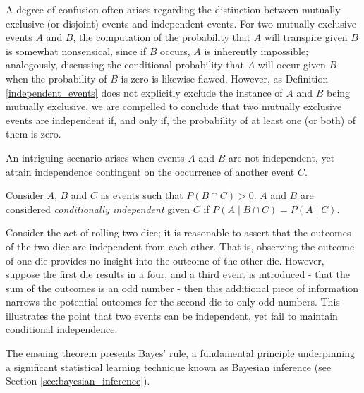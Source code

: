 \begin{example}
A degree of confusion often arises regarding the distinction between mutually exclusive (or disjoint) events and independent events. For two mutually exclusive events $A$ and $B$, the computation of the probability that $A$ will transpire given $B$ is somewhat nonsensical, since if $B$ occurs, $A$ is inherently impossible; analogously, discussing the conditional probability that $A$ will occur given $B$ when the probability of $B$ is zero is likewise flawed. However, as Definition \ref{independent_events} does not explicitly exclude the instance of $A$ and $B$ being mutually exclusive, we are compelled to conclude that two mutually exclusive events are independent if, and only if, the probability of at least one (or both) of them is zero.
\end{example}

An intriguing scenario arises when events $A$ and $B$ are not independent, yet attain independence contingent on the occurrence of another event $C$.

\begin{definition}
Consider $A$, $B$ and $C$ as events such that $P\left( B \cap C \right)>0$. $A$ and $B$ are considered \emph{conditionally independent} given $C$ if $P\left(A \mid B \cap C \right) = P\left( A \mid C \right)$.
\end{definition}

\begin{example}
Consider the act of rolling two dice; it is reasonable to assert that the outcomes of the two dice are independent from each other. That is, observing the outcome of one die provides no insight into the outcome of the other die. However, suppose the first die results in a four, and a third event is introduced - that the sum of the outcomes is an odd number - then this additional piece of information narrows the potential outcomes for the second die to only odd numbers. This illustrates the point that two events can be independent, yet fail to maintain conditional independence.
\end{example}

The ensuing theorem presents Bayes' rule, a fundamental principle underpinning a significant statistical learning technique known as Bayesian inference (see Section \ref{sec:bayesian_inference}). 

